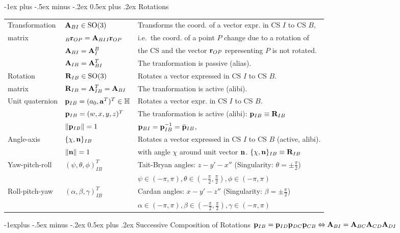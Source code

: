 \documentclass[10pt,landscape,a4paper]{article}
\makeatletter
\renewcommand{\section}{\@startsection{section}{1}{0mm}%
                                {-1ex plus -.5ex minus -.2ex}%
                                {0.5ex plus .2ex}%
                                {\normalfont\large\bfseries}}
\renewcommand{\subsection}{\@startsection{subsection}{2}{0mm}%
                                {-1explus -.5ex minus -.2ex}%
                                {0.5ex plus .2ex}%
                                {\normalfont\normalsize\bfseries}}
\makeatother
\begin{document}
\begin{multicols}{2}
\section{Rotations}
\begin{tabular}{|l|l@{}|l|}
\hline
Transformation & $\mathbf A_{BI} \in \mathrm{SO}(3)$ & Transforms the coord. of a vector expr. in CS $I$ to CS $B$,\\  
matrix & ${}_{B}\mathbf r_{OP} = \mathbf A_{BI} {}_{I}\mathbf r_{OP}$ &  i.e.\ the coord. of a point $P$ change due to a rotation of \\
& $\mathbf A_{BI} = \mathbf A_{I}^{B}$ &  the CS and the vector $\mathbf r_{OP}$ representing $P$ is not rotated. \\  
 & $\mathbf A_{IB} = \mathbf A_{BI}^T$ & The tranformation is passive (alias).\\ \hline
Rotation  & $\mathbf R_{IB} \in \mathrm{SO}(3)$ & Rotates a vector expressed in CS $I$ to CS $B$. \\ 
matrix & $\mathbf R_{IB} = \mathbf A_{IB}^T= \mathbf A_{BI}$ & The tranformation is active (alibi).\\ \hline
\multirow{2}{*}{Unit quaternion} & $\mathbf p_{IB}=(a_0, \mathbf a^T)^T\in \mathbb{H}$ &  Rotates a vector expr. in CS $I$ to CS $B$. \\
& $\mathbf p_{IB}=(w,x,y,z)^T$  & The tranformation is active (alibi): $\mathbf p_{IB} \equiv \mathbf R_{IB}$\\ 
 & $\left\lVert\mathbf p_{IB}\right\rVert=1$  & $\mathbf p_{BI} = \mathbf p_{IB}^{-1} = \bar{\mathbf p}_{IB}$,  \\ \hline
Angle-axis & $\{\chi, \mathbf n\}_{IB}$ & Rotates a vector expressed in CS $I$ to CS $B$ (active, alibi). \\
& $\lVert\mathbf n\rVert=1$ & with angle $\chi$ around unit vector $\mathbf n$.  $\{\chi, \mathbf n\}_{IB} \equiv \mathbf R_{IB}$\\ \hline
\multirow{2}{*}{Yaw-pitch-roll} &  $(\psi, \theta, \phi)_{IB}^T$  & Tait-Bryan angles: $z-y'-x''$ (Singularity: $\theta=\pm\frac{\pi}{2}$) \\
 & & $\psi\in(-\pi,\pi), \theta\in(-\frac{\pi}{2},\frac{\pi}{2}), \phi\in(-\pi,\pi)$  \\  \hline
\multirow{2}{*}{Roll-pitch-yaw} &  $(\alpha, \beta, \gamma)_{IB}^T$ & Cardan angles: $x-y'-z''$ (Singularity: $\beta=\pm\frac{\pi}{2}$)  \\
 & & $\alpha\in(-\pi,\pi), \beta\in(-\frac{\pi}{2},\frac{\pi}{2}), \gamma\in(-\pi,\pi)$  \\  \hline
\end{tabular}

\subsection{Successive Composition of Rotations}
$\mathbf p_{IB} = \mathbf p_{ID} \mathbf p_{DC} \mathbf p_{CB} \Leftrightarrow \mathbf A_{BI} = \mathbf A_{BC}\mathbf A_{CD}\mathbf A_{DI}$


\end{multicols}
\end{document}
